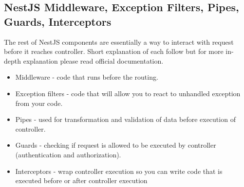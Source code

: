 \subsection{NestJS Middleware, Exception Filters, Pipes, Guards, Interceptors}\label{subsec:nestjs-others}
The rest of NestJS components are essentially a way to interact with request before it reaches controller.
Short explanation of each follow but for more in-depth explanation please read official documentation.

\begin{itemize}
  \item Middleware - code that runs before the routing.
  \item Exception filters - code that will allow you to react to unhandled exception from your code.
  \item Pipes - used for transformation and validation of data before execution of controller.
  \item Guards - checking if request is allowed to be executed by controller (authentication and authorization).
  \item Interceptors - wrap controller execution so you can write code that is executed before or after controller execution
\end{itemize}
